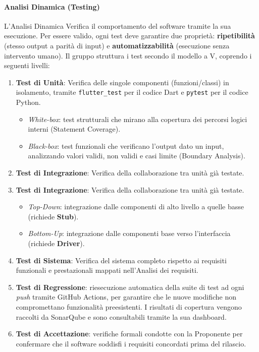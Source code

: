 \documentclass[a4paper,12pt]{article}
\newcommand{\ignoreglossary}{}
\begin{document}
\paragraph{\ignoreglossary{Analisi Dinamica} (Testing)}
L'Analisi Dinamica Verifica il comportamento del software tramite la sua esecuzione.
Per essere valido, ogni test deve garantire due proprietà: \textbf{ripetibilità} (stesso output a parità di input) e \textbf{automatizzabilità} (esecuzione senza intervento umano).
Il gruppo struttura i test secondo il modello a V, coprendo i seguenti livelli:
\begin{enumerate}
    \item \textbf{Test di Unità}: Verifica delle singole componenti (funzioni/classi) in isolamento, tramite \texttt{flutter\_test} per il codice Dart e \texttt{pytest} per il codice Python.
    \begin{itemize}
        \item \textit{White-box}: test strutturali che mirano alla copertura dei percorsi logici interni (Statement Coverage).
        \item \textit{Black-box}: test funzionali che verificano l'output dato un input, analizzando valori validi, non validi e casi limite (Boundary Analysis).
    \end{itemize}
    \item \textbf{Test di Integrazione}: Verifica della collaborazione tra unità già testate.
    \item \textbf{Test di Integrazione}: Verifica della collaborazione tra unità già testate.
    \begin{itemize}
        \item \textit{Top-Down}: integrazione dalle componenti di alto livello a quelle basse (richiede \textbf{Stub}).
        \item \textit{Bottom-Up}: integrazione dalle componenti base verso l'interfaccia (richiede \textbf{Driver}).
    \end{itemize}
    \item \textbf{Test di Sistema}: Verifica del sistema completo rispetto ai requisiti funzionali e prestazionali mappati nell'Analisi dei requisiti.
    \item \textbf{Test di Regressione}: riesecuzione automatica della suite di test ad ogni \textit{push} tramite GitHub Actions, per garantire che le nuove modifiche non compromettano funzionalità preesistenti. I risultati di copertura vengono raccolti da SonarQube e sono consultabili tramite la sua dashboard.
    \item \textbf{Test di Accettazione}: verifiche formali condotte con la Proponente per confermare che il software soddisfi i requisiti concordati prima del rilascio.
\end{enumerate}
\end{document}
